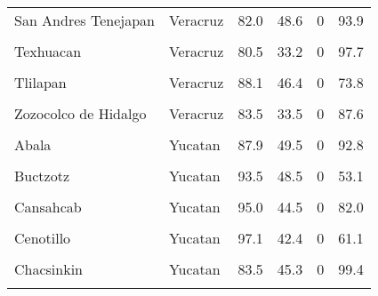 \documentclass[
]{report}
\begin{document}
\begin{longtable}[t]{llrrrr}
San Andres Tenejapan & Veracruz & 82.0 & 48.6 & 0 & 93.9\\
\cellcolor{gray!6}{Tepetzintla} & \cellcolor{gray!6}{Veracruz} & \cellcolor{gray!6}{96.2} & \cellcolor{gray!6}{42.3} & \cellcolor{gray!6}{0} & \cellcolor{gray!6}{56.5}\\
Texhuacan & Veracruz & 80.5 & 33.2 & 0 & 97.7\\
\cellcolor{gray!6}{Tlachichilco} & \cellcolor{gray!6}{Veracruz} & \cellcolor{gray!6}{81.7} & \cellcolor{gray!6}{30.1} & \cellcolor{gray!6}{0} & \cellcolor{gray!6}{63.0}\\
\addlinespace
Tlilapan & Veracruz & 88.1 & 46.4 & 0 & 73.8\\
\cellcolor{gray!6}{Zaragoza} & \cellcolor{gray!6}{Veracruz} & \cellcolor{gray!6}{92.3} & \cellcolor{gray!6}{44.2} & \cellcolor{gray!6}{0} & \cellcolor{gray!6}{91.1}\\
Zozocolco de Hidalgo & Veracruz & 83.5 & 33.5 & 0 & 87.6\\
\cellcolor{gray!6}{Tatahuicapan de Juarez} & \cellcolor{gray!6}{Veracruz} & \cellcolor{gray!6}{75.2} & \cellcolor{gray!6}{34.6} & \cellcolor{gray!6}{0} & \cellcolor{gray!6}{88.2}\\
Abala & Yucatan & 87.9 & 49.5 & 0 & 92.8\\
\addlinespace
\cellcolor{gray!6}{Akil} & \cellcolor{gray!6}{Yucatan} & \cellcolor{gray!6}{90.7} & \cellcolor{gray!6}{49.4} & \cellcolor{gray!6}{0} & \cellcolor{gray!6}{84.9}\\
Buctzotz & Yucatan & 93.5 & 48.5 & 0 & 53.1\\
\cellcolor{gray!6}{Calotmul} & \cellcolor{gray!6}{Yucatan} & \cellcolor{gray!6}{94.0} & \cellcolor{gray!6}{42.4} & \cellcolor{gray!6}{0} & \cellcolor{gray!6}{95.9}\\
Cansahcab & Yucatan & 95.0 & 44.5 & 0 & 82.0\\
\cellcolor{gray!6}{Cantamayec} & \cellcolor{gray!6}{Yucatan} & \cellcolor{gray!6}{81.9} & \cellcolor{gray!6}{46.5} & \cellcolor{gray!6}{0} & \cellcolor{gray!6}{99.0}\\
\addlinespace
Cenotillo & Yucatan & 97.1 & 42.4 & 0 & 61.1\\
\cellcolor{gray!6}{Cuncunul} & \cellcolor{gray!6}{Yucatan} & \cellcolor{gray!6}{90.2} & \cellcolor{gray!6}{43.4} & \cellcolor{gray!6}{0} & \cellcolor{gray!6}{98.7}\\
Chacsinkin & Yucatan & 83.5 & 45.3 & 0 & 99.4\\
\cellcolor{gray!6}{Chankom} & \cellcolor{gray!6}{Yucatan} & \cellcolor{gray!6}{87.1} & \cellcolor{gray!6}{44.4} & \cellcolor{gray!6}{0} & \cellcolor{gray!6}{99.6}\\

\end{longtable}
\end{document}
